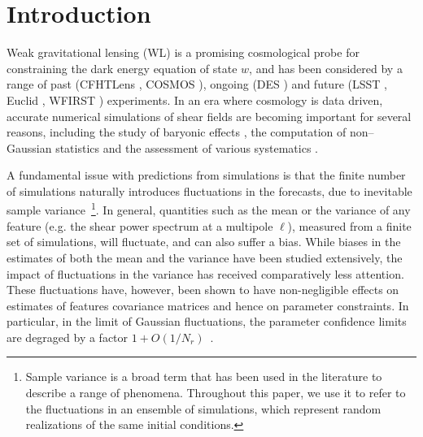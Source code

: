 \documentclass[reprint,aps,prd,superscriptaddress,showkeys,showpacs]{revtex4-1}
\begin{document}

\maketitle



\section{Introduction}
%
Weak gravitational lensing (WL) is a promising cosmological probe for
constraining the dark energy equation of state $w$, and has been
considered by a range of past (CFHTLens \citep{cfht1,cfht2}, COSMOS
\citep{cosmos}), ongoing (DES \citep{DES}) and future (LSST
\citep{LSST}, Euclid \citep{Euclid}, WFIRST \citep{WFIRST})
experiments. In an era where cosmology is data driven, accurate
numerical simulations of shear fields are becoming important for
several reasons, including the study of baryonic effects
\citep{BaryonXiuyuan,BaryonSemboloni,BaryonsWhite,BaryonsKnox,BaryonsZentner1,BaryonsZentner2},
the computation of non--Gaussian statistics
\citep{PeaksJan,MinkJan,MinkPetri,NG-Marian,NG-Jain1,NG-Jain2,NG-Jain3,NG-Refregier,NG-Dietrich}
and the assessment of various systematics
\citep{MinkShirasaki,Sys-Bard,Sys-Chang,Sys-Huterer}.

A fundamental issue with predictions from simulations is that the
finite number of simulations naturally introduces fluctuations in the
forecasts, due to inevitable sample variance~\footnote{Sample variance is a broad term that has been used in the literature to describe a range of phenomena. Throughout this paper, we use it to refer to the fluctuations in an ensemble of simulations, which represent random realizations of the same initial conditions.}. In general,
quantities such as the mean or the variance of any feature (e.g. the
shear power spectrum at a multipole $\ell$), measured from a finite
set of simulations, will fluctuate, and can also suffer a bias.  While
biases in the estimates of both the mean and the variance have been
studied extensively, the impact of fluctuations in the variance has
received comparatively less attention.  These fluctuations have,
however, been shown to have non-negligible effects on estimates of
features covariance matrices and hence on parameter constraints. In
particular, in the limit of Gaussian fluctuations, the parameter
confidence limits are degraged by a factor
$1+O(1/N_r)$~\citep{DodelsonSchneider13,Taylor12}.
\end{document}
